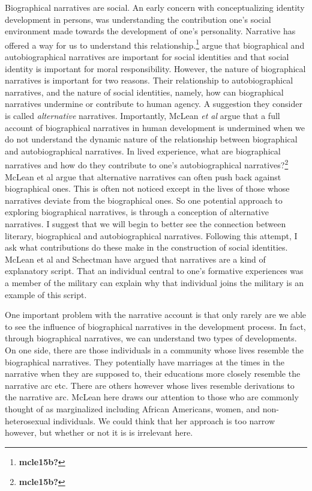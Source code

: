 \documentclass[phdthesis,12pt,final]{wuthesis}
\theoremstyle{definition}
\theoremstyle{definition}
\theoremstyle{definition}
\theoremstyle{definition}
\theoremstyle{remark}
\begin{document}
Biographical narratives are social. An early concern with conceptualizing identity development in persons, was understanding the contribution one's social environment made towards the development of one's personality. Narrative has offered a way for us to understand this relationship.\footnote{\textbf{mcle15b?}} argue that biographical and autobiographical narratives are important for social identities and that social identity is important for moral responsibility. However, the nature of biographical narratives is important for two reasons. Their relationship to autobiographical narratives, and the nature of social identities, namely, how can biographical narratives undermine or contribute to human agency. A suggestion they consider is called \emph{alternative} narratives. Importantly, McLean \emph{et al} argue that a full account of biographical narratives in human development is undermined when we do not understand the dynamic nature of the relationship between biographical and autobiographical narratives. In lived experience, what are biographical narratives and how do they contribute to one's autobiographical narratives?\footnote{\textbf{mcle15b?}} McLean et al argue that alternative narratives can often push back against biographical ones. This is often not noticed except in the lives of those whose narratives deviate from the biographical ones. So one potential approach to exploring biographical narratives, is through a conception of alternative narratives. I suggest that we will begin to better see the connection between literary, biographical and autobiographical narratives. Following this attempt, I ask what contributions do these make in the construction of social identities. McLean et al and Schectman have argued that narratives are a kind of explanatory script. That an individual central to one's formative experiences was a member of the military can explain why that individual joins the military is an example of this script.

One important problem with the narrative account is that only rarely are we able to see the influence of biographical narratives in the development process. In fact, through biographical narratives, we can understand two types of developments. On one side, there are those individuals in a community whose lives resemble the biographical narratives. They potentially have marriages at the times in the narrative when they are supposed to, their educations more closely resemble the narrative arc etc. There are others however whose lives resemble derivations to the narrative arc. McLean here draws our attention to those who are commonly thought of as marginalized including African Americans, women, and non-heterosexual individuals. We could think that her approach is too narrow however, but whether or not it is is irrelevant here.
\end{document}
